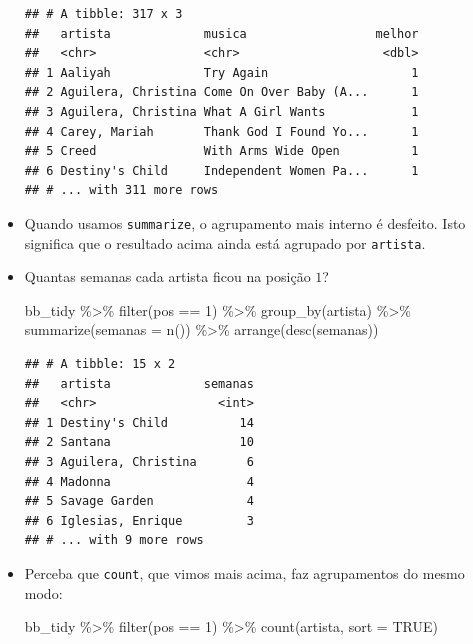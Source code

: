 \documentclass[
  11pt]{report}
\newenvironment{Shaded}{\begin{snugshade}}{\end{snugshade}}
\newcommand{\AttributeTok}[1]{\textcolor[rgb]{0.77,0.63,0.00}{#1}}
\newcommand{\ConstantTok}[1]{\textcolor[rgb]{0.00,0.00,0.00}{#1}}
\newcommand{\DecValTok}[1]{\textcolor[rgb]{0.00,0.00,0.81}{#1}}
\newcommand{\FunctionTok}[1]{\textcolor[rgb]{0.00,0.00,0.00}{#1}}
\newcommand{\NormalTok}[1]{#1}
\newcommand{\SpecialCharTok}[1]{\textcolor[rgb]{0.00,0.00,0.00}{#1}}
\renewenvironment{Shaded}{
    \begin{mdframed}[%
      roundcorner=2pt,%
      innerleftmargin=5pt,%
      innerrightmargin=5pt,%
      topline=true,%
      leftline=true,%
      rightline=true,%
      bottomline=true,%
      linewidth=0.5pt,%
      linecolor=black!20,%
      backgroundcolor=black!2,%
      skipabove=2ex,%
      skipbelow=2.5ex%
    ]%
  }
  {
    \end{mdframed}
  }
\begin{document}
\begin{itemize}
\begin{verbatim}
## # A tibble: 317 x 3
##   artista             musica                  melhor
##   <chr>               <chr>                    <dbl>
## 1 Aaliyah             Try Again                    1
## 2 Aguilera, Christina Come On Over Baby (A...      1
## 3 Aguilera, Christina What A Girl Wants            1
## 4 Carey, Mariah       Thank God I Found Yo...      1
## 5 Creed               With Arms Wide Open          1
## 6 Destiny's Child     Independent Women Pa...      1
## # ... with 311 more rows
\end{verbatim}
\item
  Quando usamos \texttt{summarize}, o agrupamento mais interno é desfeito. Isto significa que o resultado acima ainda está agrupado por \texttt{artista}.
\item
  Quantas semanas cada artista ficou na posição $1$?

\begin{Shaded}
\begin{Highlighting}[]
\NormalTok{bb\_tidy }\SpecialCharTok{\%\textgreater{}\%} 
  \FunctionTok{filter}\NormalTok{(pos }\SpecialCharTok{==} \DecValTok{1}\NormalTok{) }\SpecialCharTok{\%\textgreater{}\%} 
  \FunctionTok{group\_by}\NormalTok{(artista) }\SpecialCharTok{\%\textgreater{}\%}
  \FunctionTok{summarize}\NormalTok{(}\AttributeTok{semanas =} \FunctionTok{n}\NormalTok{()) }\SpecialCharTok{\%\textgreater{}\%} 
  \FunctionTok{arrange}\NormalTok{(}\FunctionTok{desc}\NormalTok{(semanas))}
\end{Highlighting}
\end{Shaded}

\begin{verbatim}
## # A tibble: 15 x 2
##   artista             semanas
##   <chr>                 <int>
## 1 Destiny's Child          14
## 2 Santana                  10
## 3 Aguilera, Christina       6
## 4 Madonna                   4
## 5 Savage Garden             4
## 6 Iglesias, Enrique         3
## # ... with 9 more rows
\end{verbatim}
\item
  Perceba que \texttt{count}, que vimos mais acima, faz agrupamentos do mesmo modo:

\begin{Shaded}
\begin{Highlighting}[]
\NormalTok{bb\_tidy }\SpecialCharTok{\%\textgreater{}\%} 
  \FunctionTok{filter}\NormalTok{(pos }\SpecialCharTok{==} \DecValTok{1}\NormalTok{) }\SpecialCharTok{\%\textgreater{}\%} 
  \FunctionTok{count}\NormalTok{(artista, }\AttributeTok{sort =} \ConstantTok{TRUE}\NormalTok{)}
\end{Highlighting}
\end{Shaded}


\end{itemize}
\end{document}
